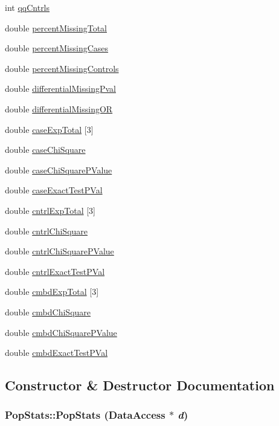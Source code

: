 \begin{DoxyCompactItemize}
int \hyperlink{classPopStats_a7670a2e68b37265b82b79da99140548e}{qqCntrls}
\item 
double \hyperlink{classPopStats_aae66e0c889d3c9dfbda08f9de5ab2838}{percentMissingTotal}
\item 
double \hyperlink{classPopStats_ac3c162696a1b86b32e5ed498a30d9fc8}{percentMissingCases}
\item 
double \hyperlink{classPopStats_af3fdc0236ca8dd90a68cdb108ebae84e}{percentMissingControls}
\item 
double \hyperlink{classPopStats_a8c72ad0a95989deb8ffc1955e15992fb}{differentialMissingPval}
\item 
double \hyperlink{classPopStats_a6eef6428b6254c26f2ae3a0fda4a7d4c}{differentialMissingOR}
\item 
double \hyperlink{classPopStats_aa6c1d435077da61fab3cf3b490a60009}{caseExpTotal} \mbox{[}3\mbox{]}
\item 
double \hyperlink{classPopStats_a80d6048c07b310b4c6863e113ebce157}{caseChiSquare}
\item 
double \hyperlink{classPopStats_a4d4ef66ca48bd4b070bec2ca2167f925}{caseChiSquarePValue}
\item 
double \hyperlink{classPopStats_aad5482320541a8d206923e0adc97ba3b}{caseExactTestPVal}
\item 
double \hyperlink{classPopStats_afb00bcd4403e7659b9b6db0dee19dcf1}{cntrlExpTotal} \mbox{[}3\mbox{]}
\item 
double \hyperlink{classPopStats_aa6327d3f5bb38e65a7ca7032e7d53b51}{cntrlChiSquare}
\item 
double \hyperlink{classPopStats_a762931d6d585d87dcde127b519fe8c1b}{cntrlChiSquarePValue}
\item 
double \hyperlink{classPopStats_a1c089d409f74e0c404a503ec2aae94e2}{cntrlExactTestPVal}
\item 
double \hyperlink{classPopStats_af9bbdcf46f5d861e351101e3709f9dc7}{cmbdExpTotal} \mbox{[}3\mbox{]}
\item 
double \hyperlink{classPopStats_a50cc2cf59e308d8f170353904ba3c6da}{cmbdChiSquare}
\item 
double \hyperlink{classPopStats_af9e0fd78b6e56a5e26efca7051580a05}{cmbdChiSquarePValue}
\item 
double \hyperlink{classPopStats_a4aec72b54ad655ce10b862d4e4319d9a}{cmbdExactTestPVal}
\end{DoxyCompactItemize}


\subsection{Constructor \& Destructor Documentation}
\hypertarget{classPopStats_a4ffd944436becd97e62cc17c7571f5b1}{
\subsubsection[{PopStats}]{\setlength{\rightskip}{0pt plus 5cm}PopStats::PopStats ({\bf DataAccess} $\ast$ {\em d})}}
\label{classPopStats_a4ffd944436becd97e62cc17c7571f5b1}


